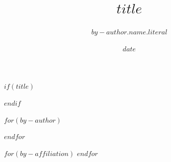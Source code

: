 $if(title)$
\title{$title$}
$endif$

$for(by-author)$
\author[$for(by-author.affiliations)$$it.number$$sep$,$endfor$]{$by-author.name.literal$}
$endfor$

$for(by-affiliation)$
$endfor$

\date{$date$}